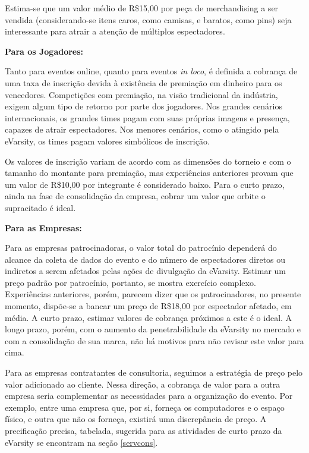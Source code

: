\documentclass[a4paper, 12pt]{paper}
\begin{document}
Estima-se que um valor médio de R\$15,00 por peça de merchandising a ser vendida (considerando-se itens caros, como camisas, e baratos, como pins) seja interessante para atrair a atenção de múltiplos espectadores.

\textbf{Para os Jogadores:}

Tanto para eventos online, quanto para eventos \textit{in loco}, é definida a cobrança de uma taxa de inscrição devida à existência de premiação em dinheiro para os vencedores. Competições com premiação, na visão tradicional da indústria, exigem algum tipo de retorno por parte dos jogadores. Nos grandes cenários internacionais, os grandes times pagam com suas próprias imagens e presença, capazes de atrair espectadores. Nos menores cenários, como o atingido pela eVarsity, os times pagam valores simbólicos de inscrição.

Os valores de inscrição variam de acordo com as dimensões do torneio e com o tamanho do montante para premiação, mas experiências anteriores provam que um valor de R\$10,00 por integrante é considerado baixo. Para o curto prazo, ainda na fase de consolidação da empresa, cobrar um valor que orbite o supracitado é ideal.

\textbf{Para as Empresas:}

Para as empresas patrocinadoras, o valor total do patrocínio dependerá do alcance da coleta de dados do evento e do número de espectadores diretos ou indiretos a serem afetados pelas ações de divulgação da eVarsity. Estimar um preço padrão por patrocínio, portanto, se mostra exercício complexo. Experiências anteriores, porém, parecem dizer que os patrocinadores, no presente momento, dispõe-se a bancar um preço de R\$18,00 por espectador afetado, em média. A curto prazo, estimar valores de cobrança próximos a este é o ideal. A longo prazo, porém, com o aumento da penetrabilidade da eVarsity no mercado e com a consolidação de sua marca, não há motivos para n\~{a}o revisar este valor para cima.

Para as empresas contratantes de consultoria, seguimos a estratégia de preço pelo valor adicionado ao cliente. Nessa direção, a cobrança de valor para a outra empresa seria complementar as necessidades para a organização do evento. Por exemplo, entre uma empresa que, por si, forneça os computadores e o espaço físico, e outra que não os forneça, existirá uma discrepância de preço. A precificação precisa, tabelada, sugerida para as atividades de curto prazo da eVarsity se encontram na seção \ref{servcons}.
\end{document}
